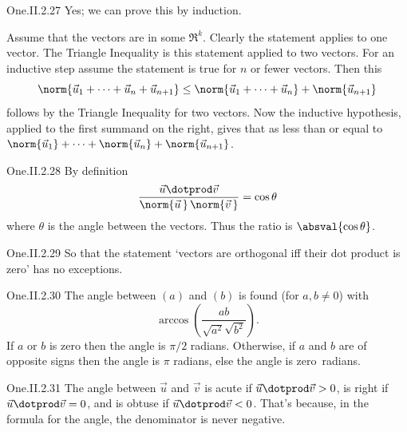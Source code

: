 \begin{ans}{One.II.2.27}
      Yes;
      we can prove this by induction.

      Assume that the vectors are in some \( \Re^k \).
      Clearly the statement applies to one vector.
      The Triangle Inequality is this statement applied to two vectors.
      For an inductive step assume the statement is true for \( n \) or fewer
      vectors.
      Then this
      \begin{equation*}
         \norm{\vec{u}_1+\cdots+\vec{u}_n+\vec{u}_{n+1}}
         \leq
         \norm{\vec{u}_1+\cdots+\vec{u}_n}+\norm{\vec{u}_{n+1}}
      \end{equation*}
      follows by the Triangle Inequality for two vectors.
      Now the inductive hypothesis, applied to the first summand on the right,
      gives that as less than or equal to
      \( \norm{\vec{u}_1}+\cdots+\norm{\vec{u}_n}+\norm{\vec{u}_{n+1}} \).
    
\end{ans}
\begin{ans}{One.II.2.28}
      By definition
      \begin{equation*}
        \frac{\vec{u}\dotprod\vec{v}}{
            \norm{\vec{u}\,}\,\norm{\vec{v}\,}}=\cos\theta
      \end{equation*}
      where \( \theta \) is the angle between the vectors.
      Thus the ratio is \( \absval{\cos\theta} \).
   
\end{ans}
\begin{ans}{One.II.2.29}
      So that the statement `vectors are orthogonal iff their
      dot product is zero' has no exceptions.
    
\end{ans}
\begin{ans}{One.II.2.30}
      The angle between \( (a) \) and \( (b) \) is found
      (for \( a,b\neq 0 \)) with
      \begin{equation*}
         \arccos(\frac{ab}{\sqrt{a^2}\sqrt{b^2}}).
      \end{equation*}
      If \( a \) or \( b \) is zero then the angle is \( \pi/2 \) radians.
      Otherwise, if \( a \) and \( b \) are of opposite signs then the angle is
      \( \pi \) radians, else the angle is zero~radians.
   
\end{ans}
\begin{ans}{One.II.2.31}
       The angle between \( \vec{u} \) and \( \vec{v} \) is acute
       if \( \vec{u}\dotprod\vec{v}> 0 \), is right if
       \( \vec{u}\dotprod\vec{v}=0 \), and is obtuse if
       \( \vec{u}\dotprod\vec{v}<0 \).
       That's because, in the formula for the angle, the denominator is never
       negative.
     
\end{ans}
